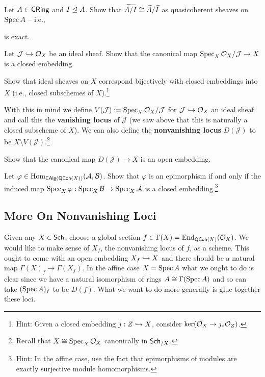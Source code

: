 \documentclass[11pt]{article}
\renewcommand{\AA}{\mathcal{A}}
\newcommand{\BB}{\mathcal{B}}
\newcommand{\J}{\mathcal{J}}
\renewcommand{\phi}{\varphi}
\begin{document}
\begin{exercise}
Let $A\in\operatorname{\mathsf{CRing}}$ and $I\trianglelefteq A$. Show that $\widetilde{A/I}\cong\widetilde{A}/\widetilde{I}$ as quasicoherent sheaves on $\operatorname{Spec} A$ -- i.e., 
\begin{center}
\end{center}
is exact.
\end{exercise}

\begin{exercise}
\hfill
\begin{enum}{\alph}
\item Let $\J\inj\O_X$ be an ideal sheaf. Show that the canonical map $\Spec_X\O_X/\J\to X$ is a closed embedding.

\item Show that ideal sheaves on $X$ correspond bijectively with closed embeddings into $X$ (i.e., closed subschemes of $X$).\footnote{Hint: Given a closed embedding $j: Z\hookrightarrow X$, consider $\ker(\mathcal{O}_X\to j_*\mathcal{O}_Z)$.}
\end{enum}
\end{exercise}

With this in mind we define $V(\J):=\Spec_X\O_X/\J$ for $\J\inj\O_X$ an ideal sheaf and call this the \textbf{vanishing locus} of $\J$ (we saw above that this is naturally a closed subscheme of $X$). We can also define the \textbf{nonvanishing locus} $D(\J)$ to be $X\setminus V(\J)$.\footnote{Recall that $X\cong\operatorname{Spec}_X\mathcal{O}_X$ canonically in $\operatorname{\mathsf{Sch}}_{/X}$.}

\begin{exercise}
Show that the canonical map $D(\J)\to X$ is an open embedding.
\end{exercise}

\begin{exercise}
Let $\phi\in\Hom_{\CAlg(\QCoh(X))}(\AA,\BB)$. Show that $\phi$ is an epimorphism if and only if the induced map $\Spec_X\phi: \Spec_X\BB\to\Spec_X\AA$ is a closed embedding.\footnote{Hint: In the affine case, use the fact that epimorphisms of modules are exactly surjective module homomorphisms.}
\end{exercise}

\subsection{More On Nonvanishing Loci}
Given any $X\in\operatorname{\mathsf{Sch}}$, choose a global section $f\in\Gamma(X)=\operatorname{End}_{\operatorname{\mathsf{QCoh}}(X)}(\mathcal{O}_X)$. We would like to make sense of $X_f$, the nonvanishing locus of $f$, as a scheme. This ought to come with an open embedding $X_f\hookrightarrow X$ and there should be a natural map $\Gamma(X)_f\to\Gamma(X_f)$. In the affine case $X=\operatorname{Spec} A$ what we ought to do is clear since we have a natural isomorphism of rings $A\cong\Gamma(\operatorname{Spec} A)$ and so can take $(\operatorname{Spec} A)_f$ to be $D(f)$. What we want to do more generally is glue together these loci.
\end{document}
